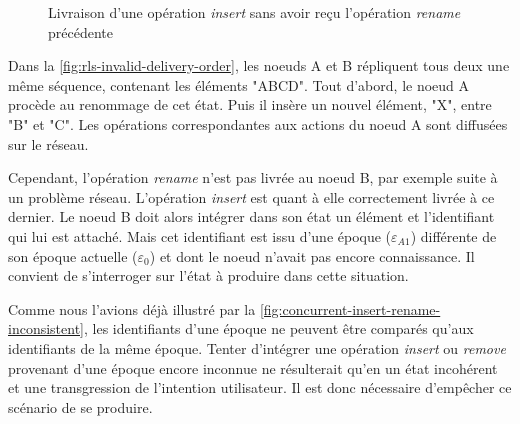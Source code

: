\documentclass[12pt]{thesul}
\newcommand{\trm}[1]{\mathit{#1}}
\newcommand{\id}[3]{$\trm{#1}^{\trm{#2}}_{\trm{#3}}$}
\newcommand{\epoch}[1]{$\varepsilon_{#1}$}
\newcommand{\widthletter}{2em}
\begin{document}
\begin{figure}[!ht]
{
  }
  \caption{Livraison d'une opération \emph{insert} sans avoir reçu l'opération \emph{rename} précédente}
  \label{fig:rls-invalid-delivery-order}
\end{figure}

Dans la \autoref{fig:rls-invalid-delivery-order}, les noeuds A et B répliquent tous deux une même séquence, contenant les éléments "ABCD".
Tout d'abord, le noeud A procède au renommage de cet état.
Puis il insère un nouvel élément, "X", entre "B" et "C".
Les opérations correspondantes aux actions du noeud A sont diffusées sur le réseau.

Cependant, l'opération \emph{rename} n'est pas livrée au noeud B, par exemple suite à un problème réseau.
L'opération \emph{insert} est quant à elle correctement livrée à ce dernier.
Le noeud B doit alors intégrer dans son état un élément et l'identifiant qui lui est attaché.
Mais cet identifiant est issu d'une époque (\epoch{A1}) différente de son époque actuelle (\epoch{0}) et dont le noeud n'avait pas encore connaissance.
Il convient de s'interroger sur l'état à produire dans cette situation.

Comme nous l'avions déjà illustré par la \autoref{fig:concurrent-insert-rename-inconsistent}, les identifiants d'une époque ne peuvent être comparés qu'aux identifiants de la même époque.
Tenter d'intégrer une opération \emph{insert} ou \emph{remove} provenant d'une époque encore inconnue ne résulterait qu'en un état incohérent et une transgression de l'intention utilisateur.
Il est donc nécessaire d'empêcher ce scénario de se produire.
\end{document}

